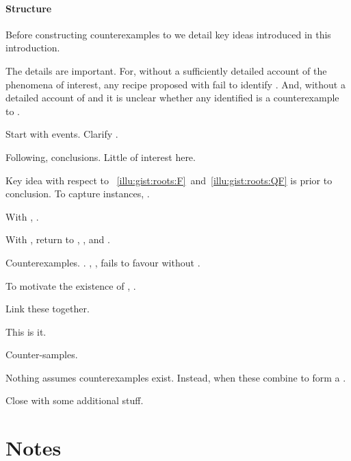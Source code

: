 \paragraph*{Structure}


\begin{note}
  Before constructing counterexamples to \issueInclusion{} we detail key ideas introduced in this introduction.

  The details are important.
  For, without a sufficiently detailed account of the phenomena of interest, any recipe proposed with fail to identify .
  And, without a detailed account of \qWhy{} and \qHow{} it is unclear whether any identified  is a counterexample to \issueInclusion{}.

  Start with events.
  Clarify \qWhy{}.

  Following, conclusions.
  Little of interest here.

  Key idea with respect to ~\ref{illu:gist:roots:F}~and~\ref{illu:gist:roots:QF} is \ros{} prior to conclusion.
  To capture instances, .

  With , .

  With , return to \qWhy{}, \qHow{}, and \issueInclusion{}.

  Counterexamples.
  .
  , , fails to favour without .

  To motivate the existence of , \tC{}.

  Link these together.

  This is it.

  Counter-samples.

  Nothing assumes counterexamples exist.
  Instead, when these combine to form a \scen{}.

  Close with some additional stuff.
\end{note}



\section*{Notes}


